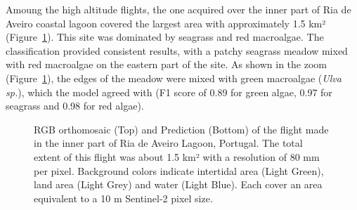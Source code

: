 \documentclass[
  number]{elsarticle}
\begin{document}
Amoung the high altitude flights, the one acquired over the inner part
of Ria de Aveiro coastal lagoon covered the largest area with
approximately 1.5 km² (Figure~\ref{fig-Boat}). This site was dominated
by seagrass and red macroalgae. The classification provided consistent
results, with a patchy seagrass meadow mixed with red macroalgae on the
eastern part of the site. As shown in the zoom (Figure~\ref{fig-Boat}),
the edges of the meadow were mixed with green macroalgae (\emph{Ulva
sp.}), which the model agreed with (F1 score of 0.89 for green algae,
0.97 for seagrass and 0.98 for red algae).

\label{cell-fig-Boat}
\begin{figure}[H]


\caption{\label{fig-Boat}RGB orthomosaic (Top) and Prediction (Bottom)
of the flight made in the inner part of Ria de Aveiro Lagoon, Portugal.
The total extent of this flight was about 1.5 km² with a resolution of
80 mm per pixel. Background colors indicate intertidal area (Light
Green), land area (Light Grey) and water (Light Blue). Each cover an
area equivalent to a 10 m Sentinel-2 pixel size.}

\end{figure}%
\end{document}

